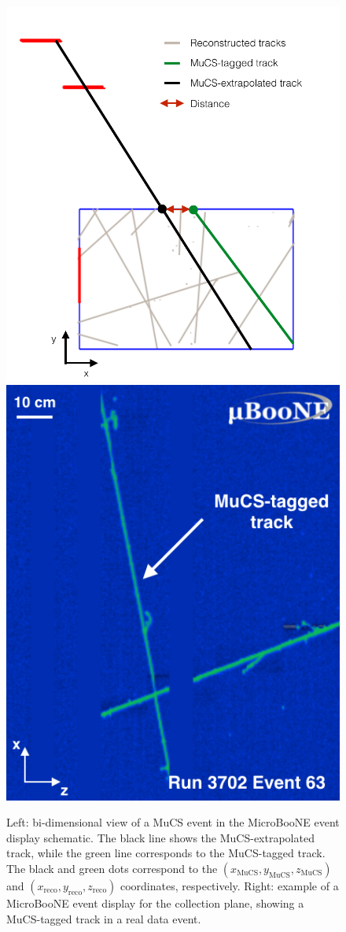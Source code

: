 \documentclass[a4paper,11pt]{article}
\begin{document}
\begin{figure}[htbp]
  \begin{center}
  \includegraphics[width=0.50\linewidth]{figures/evd.pdf}
  \includegraphics[width=0.40\linewidth]{figures/evd_display.png}

  \caption{Left: bi-dimensional view of a MuCS event in the MicroBooNE event display schematic. The black line shows the MuCS-extrapolated track, while the green line corresponds to the MuCS-tagged track. The black and green dots correspond to the $(x_{\mathrm{MuCS}},y_{\mathrm{MuCS}},z_{\mathrm{MuCS}})$ and $(x_{\mathrm{reco}},y_{\mathrm{reco}},z_{\mathrm{reco}})$ coordinates, respectively. Right: example of a MicroBooNE event display for the collection plane, showing a MuCS-tagged track in a real data event.} \label{fig:evd}
\end{center}
\end{figure}
\end{document}
